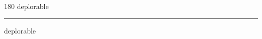 
\begin{frame}
\begin{center}
\begin{turn}{180}
{\fontsize{2.5cm}{1em}\selectfont deplorable}
\end{turn}
\vspace{1em}\par  
\hrule
\vspace{1em}\par  
{\fontsize{2.5cm}{1em}\selectfont deplorable}
\end{center}
\end{frame}
